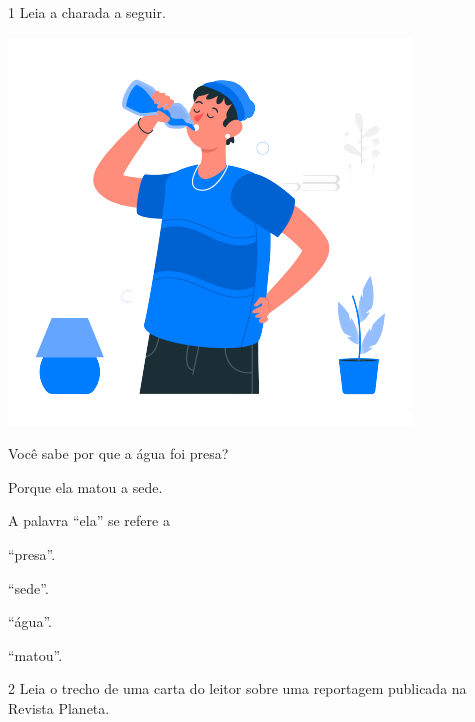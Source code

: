 \begin{conteudo}
\begin{conteudo}
\begin{conteudo}
\begin{conteudo}
\begin{conteudo}
\num{1} Leia a charada a seguir.

\begin{myquote}
\textit{}

\begin{center}
\includegraphics[width=\textwidth]{media/image55.png}
\end{center}

Você sabe por que a água foi presa?

Porque ela matou a sede.

\end{myquote}

A palavra ``ela'' se refere a

\begin{multicols}{2}
\begin{escolha}
\item ``presa''.

\item ``sede''.

\item ``água''.

\item ``matou''.
\end{escolha}
\end{multicols}
\pagebreak

\num{2} Leia o trecho de uma carta do leitor sobre uma reportagem
publicada na Revista Planeta.


\end{conteudo}
\end{conteudo}
\end{conteudo}
\end{conteudo}
\end{conteudo}
